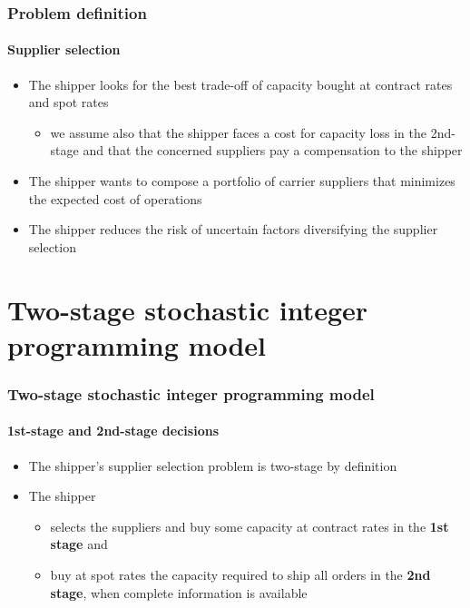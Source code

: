 \documentclass[9pt,xcolor={dvipsnames}]{beamer}
\begin{document}
\begin{frame}[allowframebreaks]
	\frametitle{Problem definition}
	\framesubtitle{Supplier selection}
	\begin{itemize}
		\item The shipper looks for the best trade-off of capacity bought at contract rates and spot rates
		\begin{itemize}
			\footnotesize
			\item we assume also that the shipper faces a cost for capacity loss in the 2nd-stage and that the concerned suppliers pay a compensation to the shipper
		\end{itemize}
		\bigskip
		\item The shipper wants to compose a portfolio of carrier suppliers that minimizes the expected cost of operations
		\bigskip
		\item The shipper reduces the risk of uncertain factors diversifying the supplier selection
	\end{itemize}
\end{frame}

\section{Two-stage stochastic integer programming model}
\begin{frame}[allowframebreaks]
	\frametitle{Two-stage stochastic integer programming model}
	\framesubtitle{1st-stage and 2nd-stage decisions}
	\begin{itemize}
		\item The shipper's supplier selection problem is two-stage by definition
		\bigskip
		\item The shipper
		\bigskip
		\begin{itemize}
		\item selects the suppliers and buy some capacity at contract rates in the \textbf{1st stage} and
		\bigskip
		\item buy at spot rates the capacity required to ship all orders in the \textbf{2nd stage}, when complete information is available
		\end{itemize}
	\end{itemize}
\end{frame}
\end{document}
